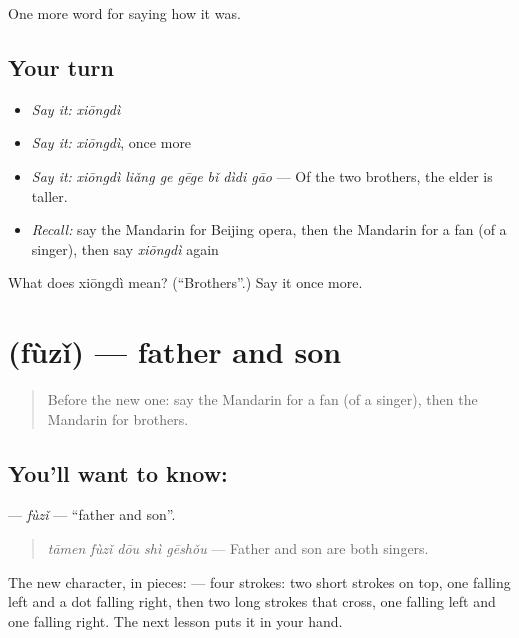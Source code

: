 \begin{grammarlens}[title={What you've built}]
One more word for saying how it was.
\end{grammarlens}

\subsection*{Your turn}
\begin{itemize}
\raggedright
  \item \emph{Say it:} \emph{xiōngdì}
  \item \emph{Say it:} \emph{xiōngdì}, once more
  \item \emph{Say it:} \emph{xiōngdì liǎng ge gēge bǐ dìdi gāo} — Of the two brothers, the elder is taller.
  \item \emph{Recall:} say the Mandarin for Beijing opera, then the Mandarin for a fan (of a singer), then say \emph{xiōngdì} again
\end{itemize}

\begin{tcolorbox}[breakable,colback=teal!4,colframe=teal!35!black,title={Before you move on}]
What does xiōngdì mean? (\textquotedblleft{}Brothers\textquotedblright{}.) Say it once more.
\end{tcolorbox}
\section[\texorpdfstring{\zh{父子} (fùzǐ)}{父子 (fùzǐ)}]{ (fùzǐ) — father and son}

\label{lesson:ZH-C507-fuzi}



\begin{quote}
Before the new one: say the Mandarin for a fan (of a singer), then the Mandarin for brothers.
\end{quote}

\subsection*{You'll want to know: }
\textbf{} — \emph{fùzǐ} — \textquotedblleft{}father and son\textquotedblright{}.

\begin{quote}
\textbf{} \emph{tāmen fùzǐ dōu shì gēshǒu} — Father and son are both singers.
\end{quote}

The new character, in pieces:  — four strokes: two short strokes on top, one falling left and a dot falling right, then two long strokes that cross, one falling left and one falling right. The next lesson puts it in your hand.

